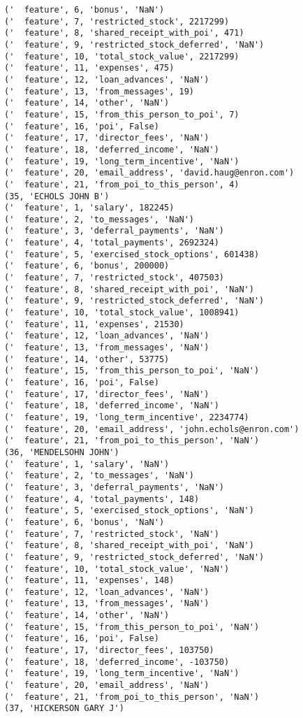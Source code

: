 \begin{verbatim}
('  feature', 6, 'bonus', 'NaN')
('  feature', 7, 'restricted_stock', 2217299)
('  feature', 8, 'shared_receipt_with_poi', 471)
('  feature', 9, 'restricted_stock_deferred', 'NaN')
('  feature', 10, 'total_stock_value', 2217299)
('  feature', 11, 'expenses', 475)
('  feature', 12, 'loan_advances', 'NaN')
('  feature', 13, 'from_messages', 19)
('  feature', 14, 'other', 'NaN')
('  feature', 15, 'from_this_person_to_poi', 7)
('  feature', 16, 'poi', False)
('  feature', 17, 'director_fees', 'NaN')
('  feature', 18, 'deferred_income', 'NaN')
('  feature', 19, 'long_term_incentive', 'NaN')
('  feature', 20, 'email_address', 'david.haug@enron.com')
('  feature', 21, 'from_poi_to_this_person', 4)
(35, 'ECHOLS JOHN B')
('  feature', 1, 'salary', 182245)
('  feature', 2, 'to_messages', 'NaN')
('  feature', 3, 'deferral_payments', 'NaN')
('  feature', 4, 'total_payments', 2692324)
('  feature', 5, 'exercised_stock_options', 601438)
('  feature', 6, 'bonus', 200000)
('  feature', 7, 'restricted_stock', 407503)
('  feature', 8, 'shared_receipt_with_poi', 'NaN')
('  feature', 9, 'restricted_stock_deferred', 'NaN')
('  feature', 10, 'total_stock_value', 1008941)
('  feature', 11, 'expenses', 21530)
('  feature', 12, 'loan_advances', 'NaN')
('  feature', 13, 'from_messages', 'NaN')
('  feature', 14, 'other', 53775)
('  feature', 15, 'from_this_person_to_poi', 'NaN')
('  feature', 16, 'poi', False)
('  feature', 17, 'director_fees', 'NaN')
('  feature', 18, 'deferred_income', 'NaN')
('  feature', 19, 'long_term_incentive', 2234774)
('  feature', 20, 'email_address', 'john.echols@enron.com')
('  feature', 21, 'from_poi_to_this_person', 'NaN')
(36, 'MENDELSOHN JOHN')
('  feature', 1, 'salary', 'NaN')
('  feature', 2, 'to_messages', 'NaN')
('  feature', 3, 'deferral_payments', 'NaN')
('  feature', 4, 'total_payments', 148)
('  feature', 5, 'exercised_stock_options', 'NaN')
('  feature', 6, 'bonus', 'NaN')
('  feature', 7, 'restricted_stock', 'NaN')
('  feature', 8, 'shared_receipt_with_poi', 'NaN')
('  feature', 9, 'restricted_stock_deferred', 'NaN')
('  feature', 10, 'total_stock_value', 'NaN')
('  feature', 11, 'expenses', 148)
('  feature', 12, 'loan_advances', 'NaN')
('  feature', 13, 'from_messages', 'NaN')
('  feature', 14, 'other', 'NaN')
('  feature', 15, 'from_this_person_to_poi', 'NaN')
('  feature', 16, 'poi', False)
('  feature', 17, 'director_fees', 103750)
('  feature', 18, 'deferred_income', -103750)
('  feature', 19, 'long_term_incentive', 'NaN')
('  feature', 20, 'email_address', 'NaN')
('  feature', 21, 'from_poi_to_this_person', 'NaN')
(37, 'HICKERSON GARY J')

\end{verbatim}
